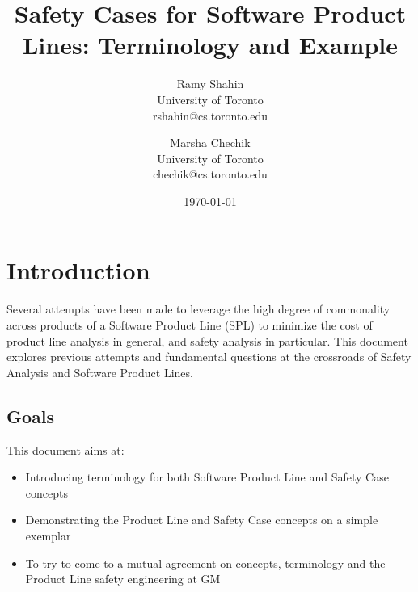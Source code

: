 \documentclass[11pt]{article}
\title{Safety Cases for Software Product Lines: Terminology and Example}
\author{Ramy Shahin \\ University of Toronto \\ rshahin@cs.toronto.edu \and
Marsha Chechik \\ University of Toronto \\ chechik@cs.toronto.edu}
\date{\today}                                           %
\begin{document}
\maketitle


\section{Introduction}



Several attempts have been made to leverage the high degree of commonality across products of a Software Product Line (SPL) to minimize the cost of product line analysis in general, and safety analysis in particular. This document explores previous attempts and fundamental questions at the crossroads of Safety Analysis and Software Product Lines.

\subsection{Goals}
This document aims at:
\begin{itemize}
\item Introducing terminology for both Software Product Line and Safety Case concepts
\item Demonstrating the Product Line and Safety Case concepts on a simple exemplar
\item To try to come to a mutual agreement on concepts, terminology and the Product Line safety engineering at GM
\end{itemize}
\end{document}
